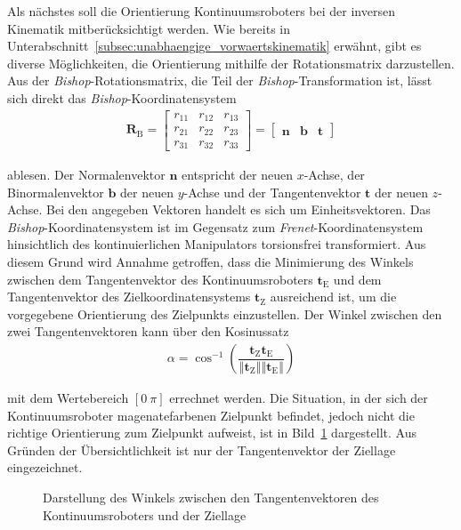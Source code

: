 Als nächstes soll die Orientierung Kontinuumsroboters bei der inversen Kinematik mitberücksichtigt werden. Wie bereits in Unterabschnitt~\ref{subsec:unabhaengige_vorwaertskinematik} erwähnt, gibt es diverse Möglichkeiten, die Orientierung mithilfe der Rotationsmatrix darzustellen. Aus der \textit{Bishop}-Rotationsmatrix, die Teil der \textit{Bishop}-Transformation ist, lässt sich direkt das \textit{Bishop}-Koordinatensystem
\begin{align}
\bm{R}_{\mathrm{B}} = 
\begin{bmatrix}
r_{11} & r_{12} & r_{13} \\
r_{21} & r_{22} & r_{23} \\
r_{31} & r_{32} & r_{33} 
\end{bmatrix} = 
\begin{bmatrix}
\bm{n} & \bm{b} & \bm{t}
\end{bmatrix}
\label{eq:bishop_koordinatensystem}
\end{align}

ablesen. Der Normalenvektor $\bm{n}$ entspricht der neuen $x$-Achse, der Binormalenvektor $\bm{b}$ der neuen $y$-Achse und der Tangentenvektor $\bm{t}$ der neuen $z$-Achse. Bei den angegeben Vektoren handelt es sich um Einheitsvektoren. Das \textit{Bishop}-Koordinatensystem ist im Gegensatz zum \textit{Frenet}-Koordinatensystem hinsichtlich des kontinuierlichen Manipulators torsionsfrei transformiert. Aus diesem Grund wird Annahme getroffen, dass die Minimierung des Winkels zwischen dem Tangentenvektor des Kontinuumsroboters $\bm{t}_{\mathrm{E}}$ und dem Tangentenvektor des Zielkoordinatensystems $\bm{t}_{\mathrm{Z}}$ ausreichend ist, um die vorgegebene Orientierung des Zielpunkts einzustellen. Der Winkel zwischen den zwei Tangentenvektoren kann über den Kosinussatz
\begin{align}
\alpha = \cos^{-1} 
\left( 
\dfrac{\bm{t}_{\mathrm{Z}} \bm{t}_{\mathrm{E}} }
{\left\Vert \bm{t}_{\mathrm{Z}}\right\Vert \left\Vert \bm{t}_{\mathrm{E}}\right\Vert} 
\right)
\label{eq:kosinussatz}
\end{align}

mit dem Wertebereich $[0~\pi]$ errechnet werden. Die Situation, in der sich der Kontinuumsroboter magenatefarbenen Zielpunkt befindet, jedoch nicht die richtige Orientierung zum Zielpunkt aufweist, ist in Bild~\ref{fig:orientation_2seg} dargestellt. Aus Gründen der Übersichtlichkeit ist nur der Tangentenvektor der Ziellage eingezeichnet. 
\begin{figure}[!hbt]
\centering
\def\svgwidth{0.5\textwidth}

\caption[Darstellung des Winkels zwischen den Tangentenvektoren des Kontinuumsroboters und der Ziellage]{Darstellung des Winkels zwischen den Tangentenvektoren des Kontinuumsroboters und der Ziellage}
\label{fig:orientation_2seg}
\end{figure}

